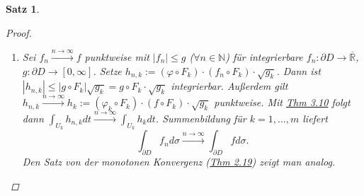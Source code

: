\documentclass[a4paper]{report}
\newcommand{\R}{\mathbb{R}}
\newcommand{\Rq}{\overline{\R}}
\newcommand{\N}{\mathbb{N}}
\newcommand{\jhyperref}[2]{\hyperref[j_#1]{#2}}
\newcommand{\jlink}[1]{\jhyperref{#1}{#1}}
\newcommand{\jabb}[3]{ #1: #2 \rightarrow #3 }
\theoremstyle{plain}
\newtheorem{satz}[thm]{Satz}
\theoremstyle{definition}
\begin{document}
{{{{\begin{satz}
\begin{proof}
\begin{enumerate}
            \item
                Sei $f_n \xrightarrow{n\rightarrow \infty} f$ punktweise mit $|f_n| \le g$ ($\forall n\in\N$) für integrierbare $\jabb{f_n}{\partial D}{\Rq}$, $\jabb{g}{\partial D}{[0,\infty]}$. Setze $h_{n,k}:= (\varphi \circ F_k)\cdot(f_n \circ F_k)\cdot\sqrt{g_k}$. Dann ist $|h_{n,k}| \le |g \circ F_k| \sqrt{g_k} = g\circ F_k \cdot \sqrt{g_k}$ integrierbar. Außerdem gilt $h_{n,k} \xrightarrow{n\rightarrow \infty} h_k := (\varphi_k \circ F_k)\cdot(f \circ F_k) \cdot \sqrt{g_k}$ punktweise. Mit \jlink{Thm 3.10} folgt dann $\int_{U_k} h_{n,k} dt \xrightarrow{n\rightarrow\infty} \int_{U_k} h_k dt$. Summenbildung für $k=1,\dots,m$ liefert
                \[
                    \int_{\partial D} f_n d\sigma \xrightarrow{n \rightarrow \infty} \int_{\partial D} f d\sigma.
                \]
                Den Satz von der monotonen Konvergenz (\jlink{Thm 2.19}) zeigt man analog.
        \end{enumerate}
    \end{proof}
\end{satz}

}}}}
\end{document}
